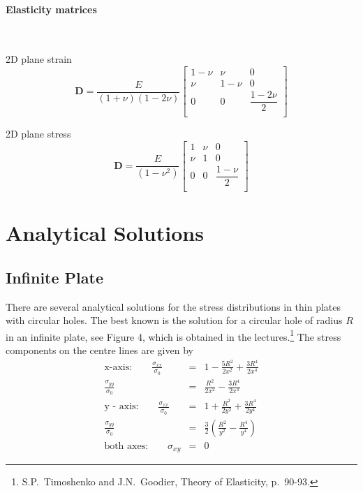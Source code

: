 \documentclass[11pt,a4paper]{article}
\begin{document}
\paragraph*{Elasticity matrices}~
\begin{trivlist}
	\item 2D plane strain
	\begin{equation*}
	\mathbf{D} =
	\frac{E}{(1+\nu)(1-2\nu)}
	\begin{bmatrix}
	1 - \nu   & \nu      & 0 \\
	\nu       & 1 - \nu  & 0 \\
	0         & 0        & \dfrac{1-2\nu}{2} \\
	\end{bmatrix}
	\end{equation*}
	
	\item  2D plane stress
	\begin{equation*}
	\mathbf{D} =
	\frac{E}{(1-\nu^{2})}
	\begin{bmatrix}
	1      & \nu      & 0 \\
	\nu    & 1        & 0 \\
	0      & 0        & \dfrac{1-\nu}{2} \\
	\end{bmatrix}
	\end{equation*}
\end{trivlist}

\section{Analytical Solutions}
\label{analytical}

\subsection{Infinite Plate}

There are several analytical solutions
for the stress distributions in thin plates with circular holes.
The best known is the solution for a circular hole of radius $R$
in an infinite plate, see Figure 4, which is obtained in the
lectures.\footnote{ S.P.\ Timoshenko and J.N.\ Goodier, Theory of
	Elasticity, p.\ 90-93.} The stress components on the centre lines
are given by
\begin{eqnarray}
\text{x-axis:}\quad \quad
\frac{\sigma_{xx}}{\sigma_0 } &=& 1 -\frac{5R^2 }{2x^2 } + \frac{3R^4}{2x^4 }  \label{eq:infiniteSX_XX}  \\
\frac{\sigma_{yy}}{\sigma_0} &=& \frac{R^2}{2x^2} - \frac{3R^4}{2x^4} \label{eq:infiniteSX_YY} \\
\text{y - axis:}\quad \quad
\frac{\sigma _{xx}}{\sigma _0} &=& 1 + \frac{R^2}{2y^2} + \frac{3R^4}{2y^4} \label{eq:infiniteSY_XX}  \\
\frac{\sigma _{yy}}{\sigma _0} &=& \frac{3}{2}\left( \frac{R^2}{y^2} -
\frac{R^4}{y^4} \right)  \label{eq:infiniteSY_YY}  \\
\text{both axes:} \quad \quad \sigma_{xy}&=&0
\end{eqnarray}
\end{document}
